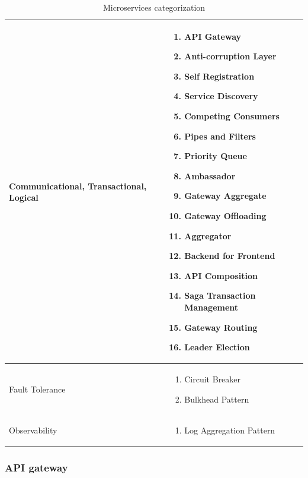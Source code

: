 \documentclass{bmcart}
\begin{document}
\begin{center}
\begin{table}[h]
\begin{tabular}{ | m{3cm} | m{8cm} | }
      Communicational, Transactional, Logical & 
      \begin{enumerate}
          \item API Gateway
          \item Anti-corruption Layer
          \item Self Registration
          \item Service Discovery
          \item Competing Consumers
          \item Pipes and Filters
          \item Priority Queue
          \item Ambassador
          \item Gateway Aggregate
          \item Gateway Offloading
          \item Aggregator
          \item Backend for Frontend
          \item API Composition
          \item Saga Transaction Management
          \item Gateway Routing
          \item Leader Election
      \end{enumerate} 
      \\

      \hline

      Fault Tolerance &
      \begin{enumerate}
          \item Circuit Breaker
          \item Bulkhead Pattern
      \end{enumerate} 
      \\
      \hline

      Observability & 
      \begin{enumerate}
          \item  Log Aggregation Pattern
      \end{enumerate} 
      \\
      \hline


  \end{tabular}
  \caption{Microservices categorization}
  \label{microservices-categorization}
  \end{table}
\end{center}


\subsubsection{API gateway}
\end{document}
